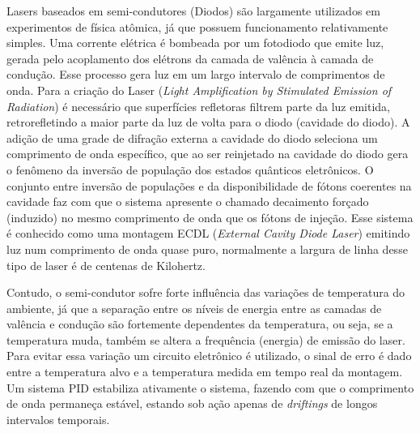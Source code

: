 Lasers baseados em semi-condutores (Diodos) são largamente utilizados em experimentos de física atômica, já que possuem funcionamento relativamente simples. Uma corrente elétrica é bombeada por um fotodiodo que emite luz, gerada pelo acoplamento dos elétrons da camada de valência à camada de condução. Esse processo gera luz em um largo intervalo de comprimentos de onda. Para a criação do Laser (\textit{Light Amplification by Stimulated Emission of Radiation}) é necessário que superfícies refletoras filtrem parte da luz emitida, retrorefletindo a maior parte da luz de volta para o diodo (cavidade do diodo). A adição de uma grade de difração externa a cavidade do diodo seleciona um comprimento de onda específico, que ao ser reinjetado na cavidade do diodo gera o fenômeno da inversão de população dos estados quânticos eletrônicos. O conjunto entre inversão de populações e da disponibilidade de fótons coerentes na cavidade faz com que o sistema apresente o chamado decaimento forçado (induzido) no mesmo comprimento de onda que os fótons de injeção. Esse sistema é conhecido como uma montagem ECDL (\textit{External Cavity Diode Laser}) emitindo luz num comprimento de onda quase puro, normalmente a largura de linha desse tipo de laser é de centenas de Kilohertz.\par
Contudo, o semi-condutor sofre forte influência das variações de temperatura do ambiente, já que a separação entre os níveis de energia entre as camadas de valência e condução são fortemente dependentes da temperatura, ou seja, se a temperatura muda, também se altera a frequência (energia) de emissão do laser. Para evitar essa variação um circuito eletrônico é utilizado, o sinal de erro é dado entre a temperatura alvo e a temperatura medida em tempo real da montagem. Um sistema PID estabiliza ativamente o sistema, fazendo com que o comprimento de onda permaneça estável, estando sob ação apenas de \textit{driftings} de longos intervalos temporais. \\
